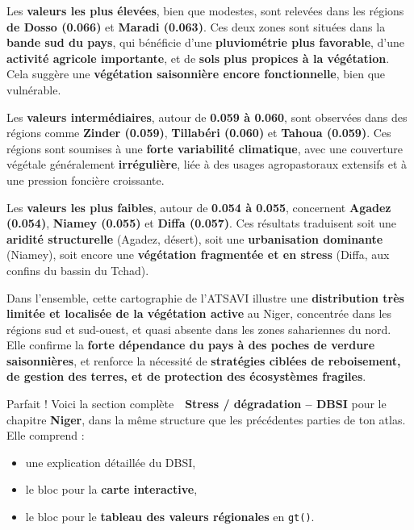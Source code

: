 \documentclass[
]{book}
\providecommand{\tightlist}{%
  \setlength{\itemsep}{0pt}\setlength{\parskip}{0pt}}
\begin{document}
Les \textbf{valeurs les plus élevées}, bien que modestes, sont relevées dans les régions \textbf{de Dosso (0.066)} et \textbf{Maradi (0.063)}. Ces deux zones sont situées dans la \textbf{bande sud du pays}, qui bénéficie d'une \textbf{pluviométrie plus favorable}, d'une \textbf{activité agricole importante}, et de \textbf{sols plus propices à la végétation}. Cela suggère une \textbf{végétation saisonnière encore fonctionnelle}, bien que vulnérable.

Les \textbf{valeurs intermédiaires}, autour de \textbf{0.059 à 0.060}, sont observées dans des régions comme \textbf{Zinder (0.059)}, \textbf{Tillabéri (0.060)} et \textbf{Tahoua (0.059)}. Ces régions sont soumises à une \textbf{forte variabilité climatique}, avec une couverture végétale généralement \textbf{irrégulière}, liée à des usages agropastoraux extensifs et à une pression foncière croissante.

Les \textbf{valeurs les plus faibles}, autour de \textbf{0.054 à 0.055}, concernent \textbf{Agadez (0.054)}, \textbf{Niamey (0.055)} et \textbf{Diffa (0.057)}. Ces résultats traduisent soit une \textbf{aridité structurelle} (Agadez, désert), soit une \textbf{urbanisation dominante} (Niamey), soit encore une \textbf{végétation fragmentée et en stress} (Diffa, aux confins du bassin du Tchad).

Dans l'ensemble, cette cartographie de l'ATSAVI illustre une \textbf{distribution très limitée et localisée de la végétation active} au Niger, concentrée dans les régions sud et sud-ouest, et quasi absente dans les zones sahariennes du nord. Elle confirme la \textbf{forte dépendance du pays à des poches de verdure saisonnières}, et renforce la nécessité de \textbf{stratégies ciblées de reboisement, de gestion des terres, et de protection des écosystèmes fragiles}.

Parfait ! Voici la section complète \textbf{🧠 Stress / dégradation -- DBSI} pour le chapitre \textbf{Niger}, dans la même structure que les précédentes parties de ton atlas. Elle comprend :

\begin{itemize}
\tightlist
\item
  une explication détaillée du DBSI,\\
\item
  le bloc pour la \textbf{carte interactive},\\
\item
  le bloc pour le \textbf{tableau des valeurs régionales} en \texttt{gt()}.
\end{itemize}
\end{document}
